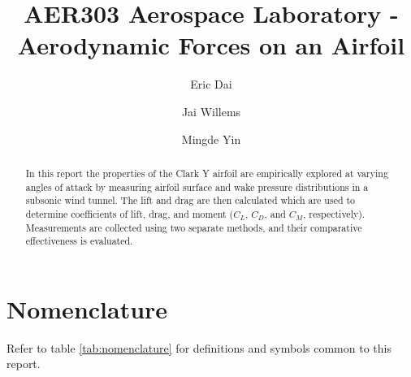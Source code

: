 \documentclass[runningheads]{llncs}
\begin{document}
\title{AER303 Aerospace Laboratory - Aerodynamic Forces on an Airfoil}

\author{Eric Dai \and Jai Willems \and Mingde Yin}


\maketitle




\begin{abstract}

In this report the properties of the Clark Y airfoil are empirically explored at varying angles of attack by measuring airfoil surface and wake pressure distributions in a subsonic wind tunnel. The lift and drag are then calculated which are used to determine coefficients of lift, drag, and moment ($C_L$, $C_D$, and $C_M$, respectively). Measurements are collected using two separate methods, and their comparative effectiveness is evaluated.

\end{abstract}




\section{Nomenclature}

Refer to table \ref{tab:nomenclature} for definitions and symbols common to this report.
\end{document}
